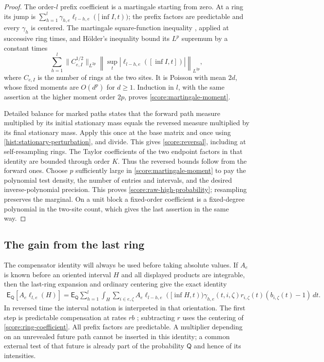 \begin{proof}
The order-$l$ prefix coefficient is a martingale starting from zero.  At a
ring its jump is
$\sum_{h=1}^l\gamma_{h,e}\ell_{l-h,e}([\inf I,t))$; the prefix factors
are predictable and every $\gamma_h$ is centered.  The martingale
square-function inequality \cite[Theorem~1.1]{BurkholderDavisGundy1972},
applied at successive ring times, and H\"older's inequality bound its $L^p$
supremum by a constant times
\[
 \sum_{h=1}^l\|C_{e,I}^{1/2}\|_{L^{2p}}
       \left\|\sup_t|\ell_{l-h,e}([\inf I,t])|\right\|_{L^{2p}},
\]
where $C_{e,I}$ is the number of rings at the two sites.  It is Poisson
with mean $2d$, whose fixed moments are $O(d^p)$ for $d\ge1$.  Induction
in $l$, with the same assertion at the higher moment order $2p$, proves
\eqref{score:martingale-moment}.

Detailed balance for marked paths states that the forward path measure
multiplied by its initial stationary mass equals the reversed measure
multiplied by its final stationary mass.  Apply this once at the base
matrix and once using \eqref{hist:stationary-perturbation}, and divide.
This gives \eqref{score:reversal}, including at self-resampling rings.
The Taylor coefficients of the two endpoint factors in that identity are
bounded through order $K$.  Thus the reversed bounds follow from the forward
ones.  Choose $p$ sufficiently large in \eqref{score:martingale-moment} to
pay the polynomial test density, the number of entries and intervals, and
the desired inverse-polynomial precision.  This proves
\eqref{score:raw-high-probability}; resampling preserves the marginal.
On a unit block a fixed-order coefficient is a fixed-degree polynomial in
the two-site count, which gives the last assertion in the same way.
\end{proof}

\subsection{The gain from the last ring}

The compensator identity will always be used before taking absolute values.
If $A_e$ is known before an oriented interval $H$ and all displayed
products are integrable, then the last-ring
expansion and ordinary centering give the exact identity
\begin{equation}\label{score:compensation-identity}
 \begin{split}
 \mathsf E_{\mathsf Q}[A_e\ell_{l,e}(H)]
 =\mathsf E_{\mathsf Q}\sum_{h=1}^l\int_H\sum_{i\in e,\zeta}
     A_e\ell_{l-h,e}([\inf H,t))\gamma_{h,e}(t,i,\zeta)
           r_{i,\zeta}(t)(b_{i,\zeta}(t)-1)\,dt .
 \end{split}
\end{equation}
In reversed time the interval notation is interpreted in that orientation.
The first step is predictable compensation at rates $rb$
\cite[Theorem~2.1]{Jacod1975}; subtracting $r$ uses the
centering of \eqref{score:ring-coefficient}.  All prefix factors are
predictable.  A multiplier depending on an unrevealed future path cannot
be inserted in this identity; a common external test of that future is
already part of the probability $\mathsf Q$ and hence of its intensities.

